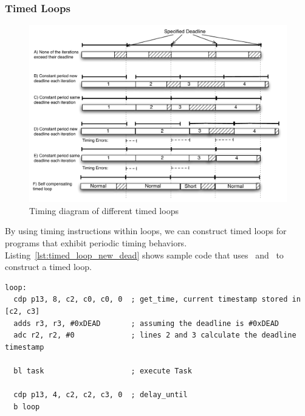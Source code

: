 \subsubsection{Timed Loops}
\begin{figure}
  \vspace{-20pt}
  \begin{center}
    \includegraphics[scale=.7]{figs/timed_loop_differences.pdf}
  \end{center}
  \vspace{-20pt}
  \caption{Timing diagram of different timed loops}
  \label{fig:timed_loop_differences}
\end{figure}
By using timing instructions within loops, we can construct timed loops for programs that exhibit periodic timing behaviors.
Listing~\ref{lst:timed_loop_new_dead} shows sample code that uses \gettime\ and \delayuntil\ to construct a timed loop.

\begin{lstlisting}[float=h, label=lst:timed_loop_new_dead,caption=Timed loops with get\_time and delay\_until ]
loop:
  cdp p13, 8, c2, c0, c0, 0  ; get_time, current timestamp stored in [c2, c3]
  adds r3, r3, #0xDEAD       ; assuming the deadline is #0xDEAD
  adc r2, r2, #0             ; lines 2 and 3 calculate the deadline timestamp
   
  bl task                    ; execute Task
  
  cdp p13, 4, c2, c2, c3, 0  ; delay_until 
  b loop
\end{lstlisting}

